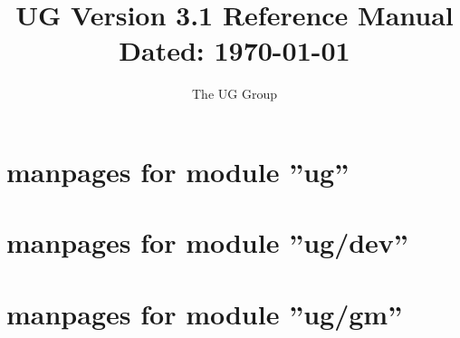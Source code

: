 


\pagestyle{myheadings}
\sloppy
\makeindex




\newcommand{\sectitle}{\mbox{}}
\setcounter{page}{0}

\title{UG Version 3.1 Reference Manual \\
	   Dated: \today}
\author{The UG Group}
\maketitle
{
\small
\tableofcontents
}
\clearpage

\thispagestyle{plain}
\section{manpages for module ''ug''}
\renewcommand{\sectitle}{ug}


\thispagestyle{plain}
\section{manpages for module ''ug/dev''}
\renewcommand{\sectitle}{ug/dev}


%

%

%

\thispagestyle{plain}
\section{manpages for module ''ug/gm''}
\renewcommand{\sectitle}{ug/gm}


